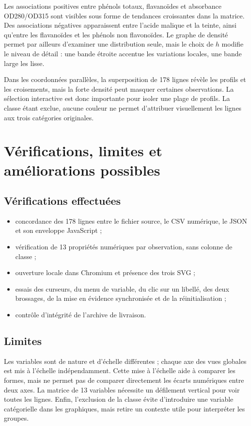 \documentclass[11pt,a4paper]{article}
\begin{document}
Les associations positives entre phénols totaux, flavanoïdes et absorbance OD280/OD315 sont visibles sous forme de tendances croissantes dans la matrice. Des associations négatives apparaissent entre l'acide malique et la teinte, ainsi qu'entre les flavanoïdes et les phénols non flavonoïdes. Le graphe de densité permet par ailleurs d'examiner une distribution seule, mais le choix de $h$ modifie le niveau de détail : une bande étroite accentue les variations locales, une bande large les lisse.

Dans les coordonnées parallèles, la superposition de 178 lignes révèle les profils et les croisements, mais la forte densité peut masquer certaines observations. La sélection interactive est donc importante pour isoler une plage de profils. La classe étant exclue, aucune couleur ne permet d'attribuer visuellement les lignes aux trois catégories originales.

\section{Vérifications, limites et améliorations possibles}
\subsection{Vérifications effectuées}
\begin{itemize}
  \item concordance des 178 lignes entre le fichier source, le CSV numérique, le JSON et son enveloppe JavaScript ;
  \item vérification de 13 propriétés numériques par observation, sans colonne de classe ;
  \item ouverture locale dans Chromium et présence des trois SVG ;
  \item essais des curseurs, du menu de variable, du clic sur un libellé, des deux brossages, de la mise en évidence synchronisée et de la réinitialisation ;
  \item contrôle d'intégrité de l'archive de livraison.
\end{itemize}

\subsection{Limites}
Les variables sont de nature et d'échelle différentes ; chaque axe des vues globales est mis à l'échelle indépendamment. Cette mise à l'échelle aide à comparer les formes, mais ne permet pas de comparer directement les écarts numériques entre deux axes. La matrice de 13 variables nécessite un défilement vertical pour voir toutes les lignes. Enfin, l'exclusion de la classe évite d'introduire une variable catégorielle dans les graphiques, mais retire un contexte utile pour interpréter les groupes.
\end{document}
